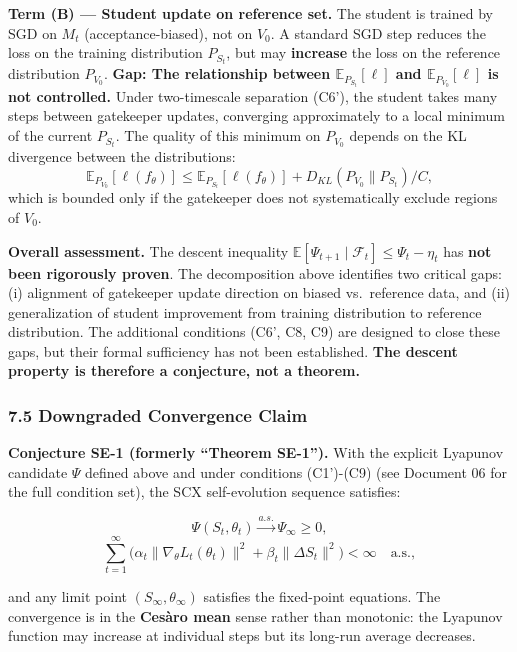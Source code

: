 \documentclass[
  12pt,
]{article}
\begin{document}
\textbf{Term (B) --- Student update on reference set.} The student is
trained by SGD on \(M_t\) (acceptance-biased), not on \(V_0\). A
standard SGD step reduces the loss on the training distribution
\(P_{S_t}\), but may \textbf{increase} the loss on the reference
distribution \(P_{V_0}\). \textbf{Gap: The relationship between
\(\mathbb{E}_{P_{S_t}}[\ell]\) and \(\mathbb{E}_{P_{V_0}}[\ell]\) is not
controlled.} Under two-timescale separation (C6'), the student takes
many steps between gatekeeper updates, converging approximately to a
local minimum of the current \(P_{S_t}\). The quality of this minimum on
\(P_{V_0}\) depends on the KL divergence between the distributions:
\[\mathbb{E}_{P_{V_0}}[\ell(f_\theta)] \leq \mathbb{E}_{P_{S_t}}[\ell(f_\theta)] + D_{KL}(P_{V_0} \| P_{S_t})/C,\]
which is bounded only if the gatekeeper does not systematically exclude
regions of \(V_0\).

\textbf{Overall assessment.} The descent inequality
\(\mathbb{E}[\Psi_{t+1} \mid \mathcal{F}_t] \leq \Psi_t - \eta_t\) has
\textbf{not been rigorously proven}. The decomposition above identifies
two critical gaps: (i) alignment of gatekeeper update direction on
biased vs.~reference data, and (ii) generalization of student
improvement from training distribution to reference distribution. The
additional conditions (C6', C8, C9) are designed to close these gaps,
but their formal sufficiency has not been established. \textbf{The
descent property is therefore a conjecture, not a theorem.}

\subsubsection{7.5 Downgraded Convergence
Claim}\label{downgraded-convergence-claim}

\textbf{Conjecture SE-1 (formerly ``Theorem SE-1'').} With the explicit
Lyapunov candidate \(\Psi\) defined above and under conditions
(C1')-(C9) (see Document 06 for the full condition set), the SCX
self-evolution sequence satisfies:

\[\Psi(S_t, \theta_t) \xrightarrow{a.s.} \Psi_\infty \geq 0,\]
\[\sum_{t=1}^\infty \bigl( \alpha_t \|\nabla_\theta L_t(\theta_t)\|^2 + \beta_t \|\Delta S_t\|^2 \bigr) < \infty \quad \text{a.s.},\]

and any limit point \((S_\infty, \theta_\infty)\) satisfies the
fixed-point equations. The convergence is in the \textbf{Cesàro mean}
sense rather than monotonic: the Lyapunov function may increase at
individual steps but its long-run average decreases.
\end{document}
